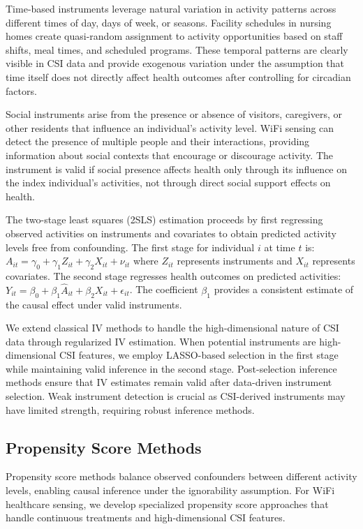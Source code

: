 \documentclass[journal]{IEEEtran}
\begin{document}
Time-based instruments leverage natural variation in activity patterns across different times of day, days of week, or seasons. Facility schedules in nursing homes create quasi-random assignment to activity opportunities based on staff shifts, meal times, and scheduled programs. These temporal patterns are clearly visible in CSI data and provide exogenous variation under the assumption that time itself does not directly affect health outcomes after controlling for circadian factors.

Social instruments arise from the presence or absence of visitors, caregivers, or other residents that influence an individual's activity level. WiFi sensing can detect the presence of multiple people and their interactions, providing information about social contexts that encourage or discourage activity. The instrument is valid if social presence affects health only through its influence on the index individual's activities, not through direct social support effects on health.

The two-stage least squares (2SLS) estimation proceeds by first regressing observed activities on instruments and covariates to obtain predicted activity levels free from confounding. The first stage for individual $i$ at time $t$ is: $A_{it} = \gamma_0 + \gamma_1 Z_{it} + \gamma_2 X_{it} + \nu_{it}$ where $Z_{it}$ represents instruments and $X_{it}$ represents covariates. The second stage regresses health outcomes on predicted activities: $Y_{it} = \beta_0 + \beta_1 \hat{A}_{it} + \beta_2 X_{it} + \epsilon_{it}$. The coefficient $\beta_1$ provides a consistent estimate of the causal effect under valid instruments.

We extend classical IV methods to handle the high-dimensional nature of CSI data through regularized IV estimation. When potential instruments are high-dimensional CSI features, we employ LASSO-based selection in the first stage while maintaining valid inference in the second stage. Post-selection inference methods ensure that IV estimates remain valid after data-driven instrument selection. Weak instrument detection is crucial as CSI-derived instruments may have limited strength, requiring robust inference methods.

\subsection{Propensity Score Methods}

Propensity score methods balance observed confounders between different activity levels, enabling causal inference under the ignorability assumption. For WiFi healthcare sensing, we develop specialized propensity score approaches that handle continuous treatments and high-dimensional CSI features.
\end{document}
